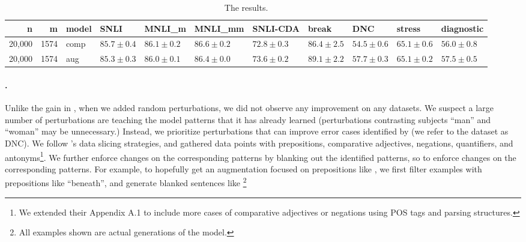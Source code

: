 \begin{table}
\small
\centering
\setlength{\tabcolsep}{4pt}
\begin{tabular}{rrlllllllll}
\toprule
     n &     m &    model &           SNLI &         MNLI\_m &        MNLI\_mm &       SNLI-CDA &          break &            DNC &         stress &     diagnostic \\
\midrule
 20,000 &  1574 &     comp 	&  $85.7\pm 0.4$&  $86.1\pm 0.2$&  $86.6\pm 0.2$&  $72.8\pm 0.3$&  $86.4\pm 2.5$&  $54.5\pm 0.6$&  $65.1\pm 0.6$&  $56.0\pm 0.8$\\
 20,000 &  1574 &  aug		&  $85.3\pm 0.3$&  $86.0\pm 0.1$&  $86.4\pm 0.0$&  $73.6\pm 0.2$&  $89.1\pm 2.2$&  $57.7\pm 0.3$&  $65.1\pm 0.2$&  $57.5\pm 0.5$\\
\bottomrule
\end{tabular}
\caption{The \nli results. }
\label{table:nli_result}
\end{table}


\paragraph{\nli.}
Unlike the gain in \sst, when we added random perturbations, we did not observe any improvement on any datasets.
We suspect a large number of perturbations are teaching the model patterns that it has already learned (\eg perturbations contrasting subjects ``man'' and ``woman'' may be unnecessary.) 
Instead, we prioritize perturbations that can improve error cases identified by \citet{kim2019probing} (we refer to the dataset as DNC).
We follow \citet{chen2019slice}'s data slicing strategies, and gathered data points with prepositions, comparative adjectives, negations, quantifiers, and antonyms\footnote{We extended their Appendix A.1 to include more cases of \eg comparative adjectives or negations using POS tags and parsing structures.}.
We further enforce changes on the corresponding patterns by blanking out the identified patterns, so to enforce changes on the corresponding patterns.
For example, to hopefully get an augmentation focused on prepositions like , we first filter examples with prepositions like ``beneath'', and generate blanked sentences like 
\footnote{All examples shown are actual generations of the model. }

